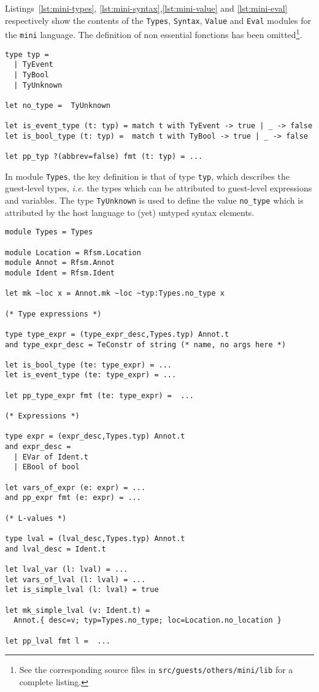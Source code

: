 Listings~\ref{lst:mini-types}, \ref{lst:mini-syntax},\ref{lst:mini-value} and \ref{lst:mini-eval}
respectively show the contents of the \texttt{Types},
\texttt{Syntax}, \texttt{Value} and \texttt{Eval} modules for the \texttt{mini} language.
The definition of non essential fonctions has been omitted\footnote{See the corresponding source files in
  \texttt{src/guests/others/mini/lib} for a complete listing.}.

\begin{lstlisting}[language={[Objective]Caml},frame=single,basicstyle=\small,caption={Module
    \texttt{Guest.Types} (excerpt)},label={lst:mini-types}]
type typ =
  | TyEvent
  | TyBool
  | TyUnknown

let no_type =  TyUnknown

let is_event_type (t: typ) = match t with TyEvent -> true | _ -> false
let is_bool_type (t: typ) =  match t with TyBool -> true | _ -> false

let pp_typ ?(abbrev=false) fmt (t: typ) = ...
\end{lstlisting}

In module \texttt{Types}, the key definition is that of type \texttt{typ}, which describes the
guest-level types, \emph{i.e.} the types which can be attributed to guest-level expressions and
variables. The type \texttt{TyUnknown} is used to define the value \texttt{no_type} which is
attributed by the host language to (yet) untyped syntax elements.

\begin{lstlisting}[language={[Objective]Caml},frame=single,basicstyle=\small,caption={Module
    \texttt{Guest.Syntax} (excerpt)}, label={lst:mini-syntax}]
module Types = Types

module Location = Rfsm.Location
module Annot = Rfsm.Annot
module Ident = Rfsm.Ident

let mk ~loc x = Annot.mk ~loc ~typ:Types.no_type x

(* Type expressions *)

type type_expr = (type_expr_desc,Types.typ) Annot.t
and type_expr_desc = TeConstr of string (* name, no args here *)

let is_bool_type (te: type_expr) = ...
let is_event_type (te: type_expr) = ...

let pp_type_expr fmt (te: type_expr) =  ...

(* Expressions *)
  
type expr = (expr_desc,Types.typ) Annot.t
and expr_desc = 
  | EVar of Ident.t
  | EBool of bool

let vars_of_expr (e: expr) = ...
and pp_expr fmt (e: expr) = ...

(* L-values *)
  
type lval = (lval_desc,Types.typ) Annot.t
and lval_desc = Ident.t

let lval_var (l: lval) = ...
let vars_of_lval (l: lval) = ...
let is_simple_lval (l: lval) = true

let mk_simple_lval (v: Ident.t) =
  Annot.{ desc=v; typ=Types.no_type; loc=Location.no_location }

let pp_lval fmt l =  ...
\end{lstlisting}

